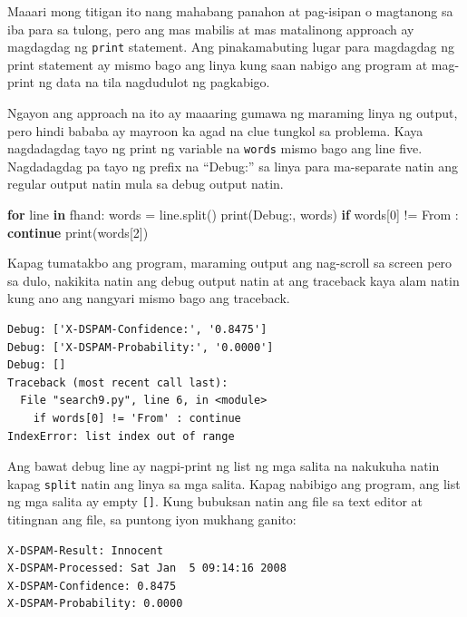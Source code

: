 \documentclass[10pt,]{book}
\newenvironment{Shaded}{}{}
\newcommand{\BuiltInTok}[1]{\textcolor[rgb]{0.00,0.50,0.00}{#1}}
\newcommand{\ControlFlowTok}[1]{\textcolor[rgb]{0.00,0.44,0.13}{\textbf{#1}}}
\newcommand{\DecValTok}[1]{\textcolor[rgb]{0.25,0.63,0.44}{#1}}
\newcommand{\KeywordTok}[1]{\textcolor[rgb]{0.00,0.44,0.13}{\textbf{#1}}}
\newcommand{\NormalTok}[1]{#1}
\newcommand{\OperatorTok}[1]{\textcolor[rgb]{0.40,0.40,0.40}{#1}}
\newcommand{\StringTok}[1]{\textcolor[rgb]{0.25,0.44,0.63}{#1}}
\begin{document}
\begin{enumerate}
  Maaari mong titigan ito nang mahabang panahon at pag-isipan o
  magtanong sa iba para sa tulong, pero ang mas mabilis at mas
  matalinong approach ay magdagdag ng \texttt{print} statement. Ang
  pinakamabuting lugar para magdagdag ng print statement ay mismo bago
  ang linya kung saan nabigo ang program at mag-print ng data na tila
  nagdudulot ng pagkabigo.

  Ngayon ang approach na ito ay maaaring gumawa ng maraming linya ng
  output, pero hindi bababa ay mayroon ka agad na clue tungkol sa
  problema. Kaya nagdadagdag tayo ng print ng variable na \texttt{words}
  mismo bago ang line five. Nagdadagdag pa tayo ng prefix na ``Debug:''
  sa linya para ma-separate natin ang regular output natin mula sa debug
  output natin.

\begin{Shaded}
\begin{Highlighting}[]
\ControlFlowTok{for}\NormalTok{ line }\KeywordTok{in}\NormalTok{ fhand:}
\NormalTok{    words }\OperatorTok{=}\NormalTok{ line.split()}
    \BuiltInTok{print}\NormalTok{(}\StringTok{\textquotesingle{}Debug:\textquotesingle{}}\NormalTok{, words)}
    \ControlFlowTok{if}\NormalTok{ words[}\DecValTok{0}\NormalTok{] }\OperatorTok{!=} \StringTok{\textquotesingle{}From\textquotesingle{}}\NormalTok{ : }\ControlFlowTok{continue}
    \BuiltInTok{print}\NormalTok{(words[}\DecValTok{2}\NormalTok{])}
\end{Highlighting}
\end{Shaded}

  Kapag tumatakbo ang program, maraming output ang nag-scroll sa screen
  pero sa dulo, nakikita natin ang debug output natin at ang traceback
  kaya alam natin kung ano ang nangyari mismo bago ang traceback.

{\small
\begin{verbatim}
Debug: ['X-DSPAM-Confidence:', '0.8475']
Debug: ['X-DSPAM-Probability:', '0.0000']
Debug: []
Traceback (most recent call last):
  File "search9.py", line 6, in <module>
    if words[0] != 'From' : continue
IndexError: list index out of range
\end{verbatim}
}

  Ang bawat debug line ay nagpi-print ng list ng mga salita na nakukuha
  natin kapag \texttt{split} natin ang linya sa mga salita. Kapag
  nabibigo ang program, ang list ng mga salita ay empty \texttt{{[}{]}}.
  Kung bubuksan natin ang file sa text editor at titingnan ang file, sa
  puntong iyon mukhang ganito:

{\small
\begin{verbatim}
X-DSPAM-Result: Innocent
X-DSPAM-Processed: Sat Jan  5 09:14:16 2008
X-DSPAM-Confidence: 0.8475
X-DSPAM-Probability: 0.0000


\end{verbatim}}
\end{enumerate}
\end{document}
